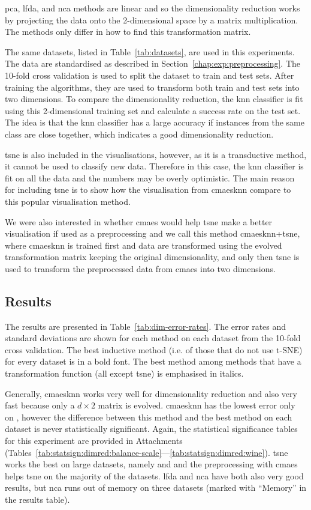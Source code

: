 \ac{pca}, \ac{lfda}, and \ac{nca} methods are linear and so the dimensionality reduction works by projecting the data onto the 2-dimensional space by a matrix multiplication. The methods only differ in how to find this transformation matrix.

The same datasets, listed in Table~\ref{tab:datasets}, are used in this experiments. The data are standardised as described in Section~\ref{chap:exp:preprocessing}. The 10-fold cross validation is used to split the dataset to train and test sets. After training the algorithms, they are used to transform both train and test sets into two dimensions. To compare the dimensionality reduction, the \ac{knn} classifier is fit using this 2-dimensional training set and calculate a success rate on the test set. The idea is that the \ac{knn} classifier has a large accuracy if instances from the same class are close together, which indicates a good dimensionality reduction. 

\ac{tsne} is also included in the visualisations, however, as it is a transductive method, it cannot be used to classify new data. Therefore in this case, the \ac{knn} classifier is fit on all the data and the numbers may be overly optimistic. The main reason for including \ac{tsne} is to show how the visualisation from \ac{cmaesknn} compare to this popular visualisation method.

We were also interested in whether \ac{cmaes} would help \ac{tsne} make a better visualisation if used as a preprocessing and we call this method \ac{cmaesknn}+\ac{tsne}, where \ac{cmaesknn} is trained first and data are transformed using the evolved transformation matrix keeping the original dimensionality, and only then \ac{tsne} is used to transform the preprocessed data from \ac{cmaes} into two dimensions.

\subsection{Results}

The results are presented in Table~\ref{tab:dim-error-rates}. The error rates and standard deviations are shown for each method on each dataset from the 10-fold cross validation. The best inductive method (i.e. of those that do not use t-SNE) for every dataset is in a bold font. The best method among methods that have a transformation function (all except \ac{tsne}) is emphasised in italics.

Generally, \ac{cmaesknn} works very well for dimensionality reduction and also very fast because only a $d\times2$ matrix is evolved. \ac{cmaesknn} has the lowest error only on , however the difference between this method and the best method on each dataset is never statistically significant. Again, the statistical significance tables for this experiment are provided in Attachments (Tables~\ref{tab:statsign:dimred:balance-scale}---\ref{tab:statsign:dimred:wine}). \ac{tsne} works the best on large datasets, namely  and  and the preprocessing with \ac{cmaes} helps \ac{tsne} on the majority of the datasets. \ac{lfda} and \ac{nca} have both also very good results, but \ac{nca} runs out of memory on three datasets (marked with ``Memory'' in the results table).

